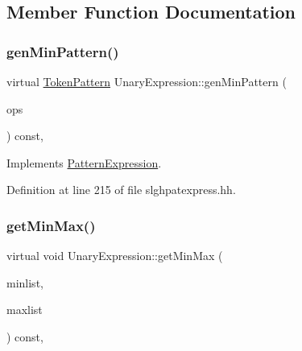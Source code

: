 \subsection{Member Function Documentation}
\mbox{\label{class_unary_expression_a007556c4977ab285520e4555a71ea8de}} 
\subsubsection{\texorpdfstring{genMinPattern()}{genMinPattern()}}
{\footnotesize\ttfamily virtual \mbox{\hyperlink{class_token_pattern}{Token\+Pattern}} Unary\+Expression\+::gen\+Min\+Pattern (\begin{DoxyParamCaption}\item[{const vector$<$ \mbox{\hyperlink{class_token_pattern}{Token\+Pattern}} $>$ \&}]{ops }\end{DoxyParamCaption}) const\hspace{0.3cm}{\ttfamily [inline]}, {\ttfamily [virtual]}}



Implements \mbox{\hyperlink{class_pattern_expression_a1dc2d0c07f64fdab9da6c0849e992b50}{Pattern\+Expression}}.



Definition at line 215 of file slghpatexpress.\+hh.

\mbox{\label{class_unary_expression_a1fec3bdcd57cc6bca29f8a00f0e7c406}} 
\subsubsection{\texorpdfstring{getMinMax()}{getMinMax()}}
{\footnotesize\ttfamily virtual void Unary\+Expression\+::get\+Min\+Max (\begin{DoxyParamCaption}\item[{vector$<$ \mbox{\hyperlink{types_8h_aa925ba3e627c2df89d5b1cfe84fb8572}{intb}} $>$ \&}]{minlist,  }\item[{vector$<$ \mbox{\hyperlink{types_8h_aa925ba3e627c2df89d5b1cfe84fb8572}{intb}} $>$ \&}]{maxlist }\end{DoxyParamCaption}) const\hspace{0.3cm}{\ttfamily [inline]}, {\ttfamily [virtual]}}



